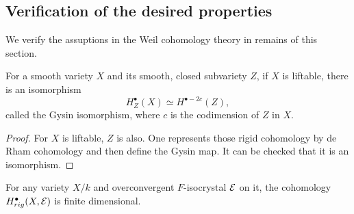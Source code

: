 \subsection{Verification of the desired properties}
We verify the assuptions in the Weil cohomology theory in remains of this section. 
\begin{proposition}
    For a smooth variety $X$ and its smooth, closed subvariety $Z$, 
    if $X$ is liftable, there is an isomorphism
    \[
        H^\bullet_Z(X) \simeq H^{\bullet-2c}(Z),
    \]
    called the Gysin isomorphism, where $c$ is the codimension of $Z$ in $X$.
\end{proposition}

\begin{proof}
    For $X$ is liftable, $Z$ is also. 
    One represents those rigid cohomology by de Rham cohomology 
    and then define the Gysin map. 
    It can be checked that it is an isomorphism.
\end{proof}

\begin{theorem}
    For any variety $X / k$ and overconvergent $F$-isocrystal ${\mathcal {E}}$ on it, 
    the cohomology $H^\bullet_{rig}(X, {\mathcal {E}})$ is finite dimensional.
\end{theorem}


